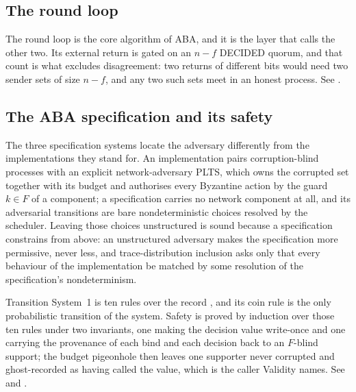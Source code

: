 \subsection{The round loop}

The round loop is the core algorithm of ABA, and it is the layer that calls the other two.
Its external return is gated on an $n-f$ DECIDED quorum, and that count is what excludes disagreement: two returns of different bits would need two sender sets of size $n-f$, and any two such sets meet in an honest process.
See .




\subsection{The ABA specification and its safety}

The three specification systems locate the adversary differently from the implementations they stand for.
An implementation pairs corruption-blind processes with an explicit network-adversary PLTS, which owns the corrupted set together with its budget and authorises every Byzantine action by the guard $k \in F$ of a component; a specification carries no network component at all, and its adversarial transitions are bare nondeterministic choices resolved by the scheduler.
Leaving those choices unstructured is sound because a specification constrains from above: an unstructured adversary makes the specification more permissive, never less, and trace-distribution inclusion asks only that every behaviour of the implementation be matched by some resolution of the specification's nondeterminism.

Transition System~1 is ten rules over the record , and its coin rule is the only probabilistic transition of the system.
Safety is proved by induction over those ten rules under two invariants, one making the decision value write-once and one carrying the provenance of each bind and each decision back to an $F$-blind support; the budget pigeonhole then leaves one supporter never corrupted and ghost-recorded as having called the value, which is the caller Validity names.
See  and .

